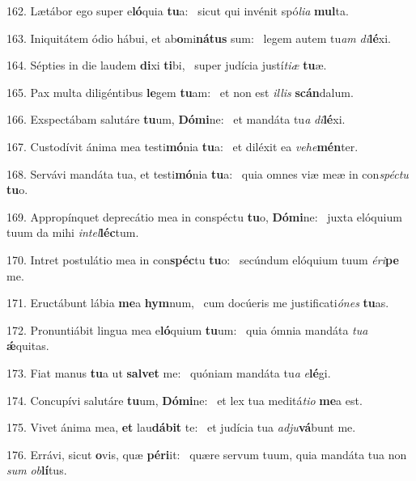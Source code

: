 162. Lætábor ego super e\textbf{ló}quia \textbf{tu}a: \ast\  sicut qui invénit spó\textit{li}\textit{a} \textbf{mul}ta.\

163. Iniquitátem ódio hábui, et ab\textbf{o}mi\textbf{ná}\textbf{tus} sum: \ast\  legem autem tu\textit{am} \textit{di}\textbf{lé}xi.\

164. Sépties in die laudem \textbf{di}xi \textbf{ti}bi, \ast\  super judícia justí\textit{ti}\textit{æ} \textbf{tu}æ.\

165. Pax multa diligéntibus \textbf{le}gem \textbf{tu}am: \ast\  et non est \textit{il}\textit{lis} \textbf{scán}dalum.\

166. Exspectábam salutáre \textbf{tu}um, \textbf{Dó}\textbf{mi}ne: \ast\  et mandáta tu\textit{a} \textit{di}\textbf{lé}xi.\

167. Custodívit ánima mea testi\textbf{mó}nia \textbf{tu}a: \ast\  et diléxit ea \textit{ve}\textit{he}\textbf{mén}ter.\

168. Servávi mandáta tua, et testi\textbf{mó}nia \textbf{tu}a: \ast\  quia omnes viæ meæ in con\textit{spéc}\textit{tu} \textbf{tu}o.\

169. Appropínquet deprecátio mea in conspéctu \textbf{tu}o, \textbf{Dó}\textbf{mi}ne: \ast\  juxta elóquium tuum da mihi \textit{in}\textit{tel}\textbf{léc}tum.\

170. Intret postulátio mea in con\textbf{spéc}tu \textbf{tu}o: \ast\  secúndum elóquium tuum \textit{é}\textit{ri}\textbf{pe} me.\

171. Eructábunt lábia \textbf{me}a \textbf{hym}num, \ast\  cum docúeris me justificati\textit{ó}\textit{nes} \textbf{tu}as.\

172. Pronuntiábit lingua mea e\textbf{ló}quium \textbf{tu}um: \ast\  quia ómnia mandáta \textit{tu}\textit{a} \textbf{ǽ}quitas.\

173. Fiat manus \textbf{tu}a ut \textbf{sal}\textbf{vet} me: \ast\  quóniam mandáta tu\textit{a} \textit{e}\textbf{lé}gi.\

174. Concupívi salutáre \textbf{tu}um, \textbf{Dó}\textbf{mi}ne: \ast\  et lex tua meditá\textit{ti}\textit{o} \textbf{me}a est.\

175. Vivet ánima mea, \textbf{et} lau\textbf{dá}\textbf{bit} te: \ast\  et judícia tua \textit{ad}\textit{ju}\textbf{vá}bunt me.\

176. Errávi, sicut \textbf{o}vis, quæ \textbf{pér}\textbf{i}it: \ast\  quære servum tuum, quia mandáta tua non \textit{sum} \textit{ob}\textbf{lí}tus.\

